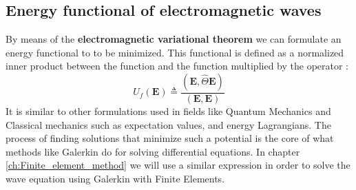  \subsection{Energy functional of electromagnetic waves}
 
By means of the \textbf{electromagnetic variational theorem} we can formulate an energy functional to  to be minimized. This functional is defined as a normalized inner product between the function and the function multiplied by the operator :
\begin{equation}
U_f(\mathbf{E}) \triangleq \frac{\left(\mathbf{E}, \hat{\Theta} \mathbf{E}\right)}{\left(\mathbf{E},\mathbf{E}\right)}
\label{eq:energy_functional}
\end{equation}
It is similar to other formulations used in fields like Quantum Mechanics and Classical mechanics such as expectation values, and energy Lagrangians.  The process of finding solutions that minimize such a potential is the core of what methods like Galerkin do for solving differential equations. In chapter \ref{ch:Finite_element_method} we will use a similar expression in order to solve the wave equation using Galerkin with Finite Elements.
 
